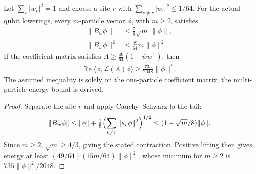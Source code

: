 \begin{lemma}
    \label{thm:hastings05_hard_core_sector_gap}
    \leanok
    Let $\sum_v|w_v|^2=1$ and choose a site $r$ with
    $\sum_{v\ne r}|w_v|^2\le1/64$. For the actual qubit lowerings,
    every $m$-particle vector $\phi$, with $m\ge2$, satisfies
    \begin{align*}
        \|B_w\phi\|   & \le\tfrac78\sqrt m\,\|\phi\|, \\
        \|B_w\phi\|^2 & \le\tfrac{49}{64}m\|\phi\|^2.
    \end{align*}
    If the coefficient matrix satisfies
    $A\ge\tfrac{49}{64}(1-\overline w w^{\mathsf T})$, then
    \begin{align*}
        \operatorname{Re}\langle\phi,\mathcal L(A)\phi\rangle
        \ge\tfrac{735}{2048}\|\phi\|^2.
    \end{align*}
    The assumed inequality is solely on the one-particle coefficient
    matrix; the multi-particle energy bound is derived.
\end{lemma}
\begin{proof}\leanok
    Separate the site $r$ and apply Cauchy--Schwarz to the tail:
    \begin{align*}
        \|B_w\phi\|\le\|\phi\|+
        \tfrac18\Bigl(\sum_{v\ne r}\|s_v\phi\|^2\Bigr)^{1/2}
        \le(1+\sqrt m/8)\|\phi\|.
    \end{align*}
    Since $m\ge2$, $\sqrt m\ge4/3$, giving the stated contraction.
    Positive lifting then gives energy at least
    $(49/64)(15m/64)\|\phi\|^2$, whose minimum for $m\ge2$ is
    $735\|\phi\|^2/2048$.
\end{proof}
